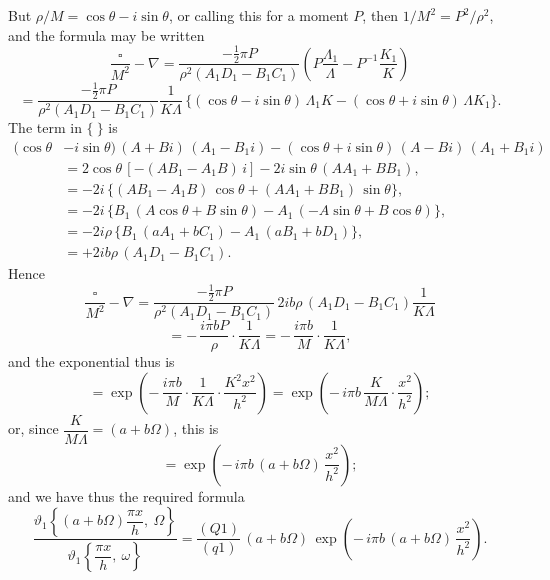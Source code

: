 \documentclass[11pt,a4paper]{article}
\begin{document}
\thispagestyle{plain}
\noindent But $\rho/M = \cos\theta - i\sin\theta$, or calling this for a moment $P$, then $1/M^{2} = P^{2}/\rho^{2}$, and the formula may be written
\[
\frac{\square}{M^{2}} - \nabla = \frac{-\tfrac{1}{2}\pi P}{\rho^{2}(A_{1}D_{1} - B_{1}C_{1})}\!\left(P\frac{\Lambda_{1}}{\Lambda} - P^{-1}\frac{K_{1}}{K}\right)
\]
\[
= \frac{-\tfrac{1}{2}\pi P}{\rho^{2}(A_{1}D_{1} - B_{1}C_{1})}\frac{1}{K\Lambda}\,\{(\cos\theta - i\sin\theta)\,\Lambda_{1}K - (\cos\theta + i\sin\theta)\,\Lambda K_{1}\}.
\]
The term in $\{\ \}$ is
\[
\begin{aligned}
(\cos\theta &- i\sin\theta)\,(A + Bi)\,(A_{1} - B_{1}i) - (\cos\theta + i\sin\theta)\,(A - Bi)\,(A_{1} + B_{1}i)\\
 &= 2\cos\theta\,[-(AB_{1} - A_{1}B)\,i] - 2i\sin\theta\,(AA_{1} + BB_{1}),\\
 &= -2i\,\{(AB_{1} - A_{1}B)\,\cos\theta + (AA_{1} + BB_{1})\,\sin\theta\},\\
 &= -2i\,\{B_{1}\,(A\cos\theta + B\sin\theta) - A_{1}\,(-A\sin\theta + B\cos\theta)\},\\
 &= -2i\rho\,\{B_{1}\,(aA_{1} + bC_{1}) - A_{1}\,(aB_{1} + bD_{1})\},\\
 &= +2ib\rho\,(A_{1}D_{1} - B_{1}C_{1}).
\end{aligned}
\]
Hence
\[
\frac{\square}{M^{2}} - \nabla = \frac{-\tfrac{1}{2}\pi P}{\rho^{2}(A_{1}D_{1} - B_{1}C_{1})}\,2ib\rho\,(A_{1}D_{1} - B_{1}C_{1})\frac{1}{K\Lambda}
\]
\[
= -\,\frac{i\pi b P}{\rho}\cdot\frac{1}{K\Lambda} = -\,\frac{i\pi b}{M}\cdot\frac{1}{K\Lambda},
\]
and the exponential thus is
\[
= \exp\!\left(-\,\frac{i\pi b}{M}\cdot\frac{1}{K\Lambda}\cdot\frac{K^{2}x^{2}}{h^{2}}\right) = \exp\!\left(-\,i\pi b\,\frac{K}{M\Lambda}\cdot\frac{x^{2}}{h^{2}}\right);
\]
or, since $\dfrac{K}{M\Lambda} = (a + b\Omega)$, this is
\[
= \exp\!\left(-\,i\pi b\,(a + b\Omega)\,\frac{x^{2}}{h^{2}}\right);
\]
and we have thus the required formula
\[
\frac{\vartheta_{1}\!\left\{(a + b\Omega)\dfrac{\pi x}{h},\ \Omega\right\}}{\vartheta_{1}\!\left\{\dfrac{\pi x}{h},\ \omega\right\}} = \frac{(Q1)}{(q1)}\,(a + b\Omega)\,\exp\!\left(-\,i\pi b\,(a + b\Omega)\,\frac{x^{2}}{h^{2}}\right).
\]
\clearpage
\end{document}
